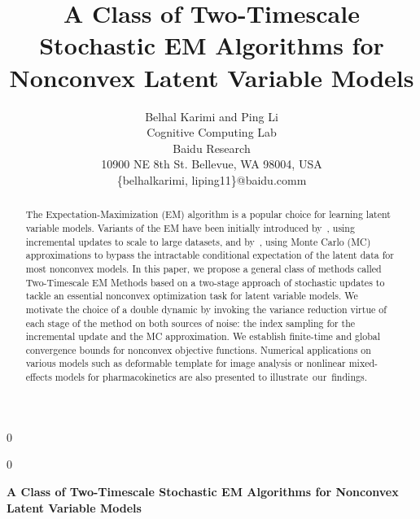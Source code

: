 \documentclass[12pt]{article}
\newcommand{\blind}{0}
\begin{document}
\def\spacingset#1{\renewcommand{\baselinestretch}%
{#1}\small\normalsize} \spacingset{1}



\blind
{
  \title{\bf A Class of Two-Timescale Stochastic EM Algorithms for Nonconvex Latent Variable Models}
  \author{Belhal Karimi and Ping Li\hspace{.2cm}\\
    Cognitive Computing Lab \\
    Baidu Research \\
    10900 NE 8th St. Bellevue, WA 98004, USA\\
    \{belhalkarimi, liping11\}@baidu.comm}
  \maketitle
} \fi

\blind
{
  \bigskip
  \bigskip
  \bigskip
  \begin{center}
    {\LARGE\bf A Class of Two-Timescale Stochastic EM Algorithms for Nonconvex Latent Variable Models}
\end{center}
  \medskip
} \fi

\bigskip
\begin{abstract}
\noindent The Expectation-Maximization (EM) algorithm is a popular choice for learning latent variable models. 
Variants of the EM have been initially introduced by~\citet{neal1998view}, using incremental updates to scale to large datasets, and by~\citet{wei1990monte, delyon1999}, using Monte Carlo (MC) approximations to bypass the intractable conditional expectation of the latent data for most nonconvex models.
In this paper, we propose a general class of methods called Two-Timescale EM Methods based on a two-stage approach of stochastic updates to tackle an essential nonconvex optimization task for latent variable models.
We motivate the choice of a double dynamic by invoking the variance reduction virtue of each stage of the method on both sources of noise: the index sampling for the incremental update and the MC approximation.
We establish finite-time and global convergence bounds for nonconvex objective functions.
Numerical applications on various models such as deformable template for {image analysis} or nonlinear mixed-effects models for {pharmacokinetics} are also presented to illustrate~our~findings.\\
\end{abstract}
\end{document}
